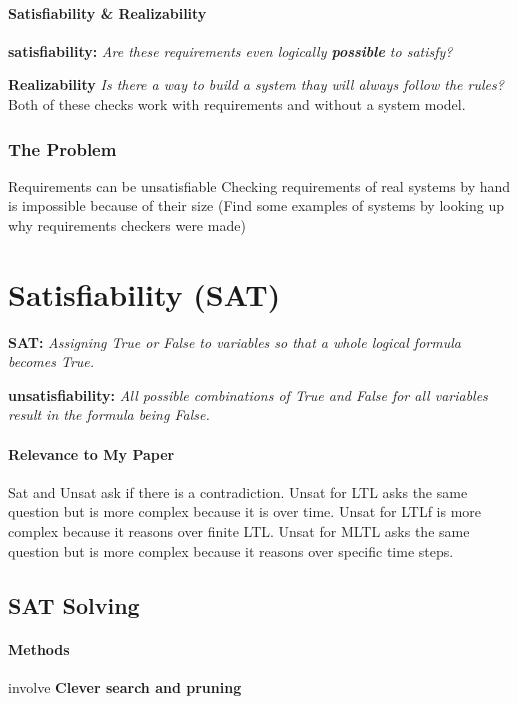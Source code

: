 \documentclass{article}
\begin{document}
\paragraph{Satisfiability \& Realizability}

\textbf{satisfiability:}
    \emph{Are these requirements even logically \textbf{possible} to satisfy?}

\textbf{Realizability}
    \emph{Is there a way to build a system thay will always follow the rules?}
Both of these checks work with requirements and without a system model.

\subsubsection*{The Problem}
Requirements can be unsatisfiable
Checking requirements of real systems by hand is impossible because of their size (Find some examples of systems by looking up why requirements checkers were made)




\section*{Satisfiability (SAT)}

\textbf{SAT:}
    \emph{Assigning True or False to variables so that a whole logical formula becomes True.}

\textbf{unsatisfiability:}
    \emph{All possible combinations of True and False for all variables result in the formula being False.}

\paragraph{Relevance to My Paper}
Sat and Unsat ask if there is a contradiction. Unsat for LTL asks the same question but is more complex because it is over time. Unsat for LTLf is more complex because it reasons over finite LTL. Unsat for MLTL asks the same question but is more complex because it reasons over specific time steps.

\subsection*{SAT Solving}
\paragraph{Methods} involve \textbf{Clever search and pruning}
\end{document}
